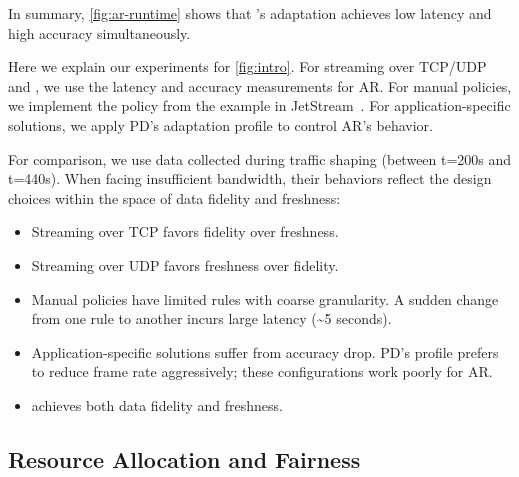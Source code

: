 In summary, \autoref{fig:ar-runtime} shows that \sysname{}'s adaptation achieves
low latency and high accuracy simultaneously.

 Here we explain our experiments for
\autoref{fig:intro}. For streaming over TCP/UDP and \sysname{}, we use the
latency and accuracy measurements for AR\@. For manual policies, we implement the
policy from the example in JetStream~\cite{rabkin2014aggregation}. For
application-specific solutions, we apply PD's adaptation profile to control AR's
behavior.

For comparison, we use data collected during traffic shaping (between t=200s and
t=440s). When facing insufficient bandwidth, their behaviors reflect the design
choices within the space of data fidelity and freshness:

\begin{itemize}[leftmargin=*, topsep=0pt, itemsep=0pt]
\item Streaming over TCP favors fidelity over freshness.
\item Streaming over UDP favors freshness over fidelity.
\item Manual policies have limited rules with coarse granularity. A sudden
  change from one rule to another incurs large latency (\textasciitilde 5
  seconds).
\item Application-specific solutions suffer from accuracy drop. PD's profile
  prefers to reduce frame rate aggressively; these configurations work poorly
  for AR\@.
\item \sysname{} achieves both data fidelity and freshness.
\end{itemize}

\subsection{Resource Allocation and Fairness}
\label{sec:multi-task-alloc}

